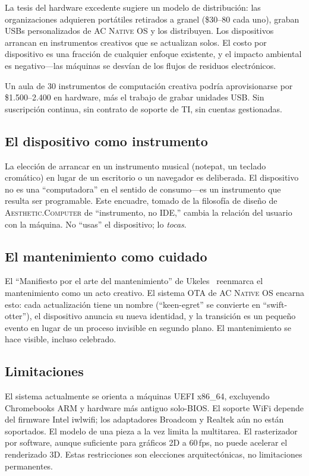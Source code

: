 \documentclass[10pt,letterpaper,twocolumn]{article}
\newcommand{\ac}{\textsc{Aesthetic.Computer}}
\newcommand{\acos}{\textsc{AC Native OS}}
\begin{document}
La tesis del hardware excedente sugiere un modelo de distribución: las organizaciones adquieren portátiles retirados a granel (\$30--80 cada uno), graban USBs personalizados de \acos{} y los distribuyen. Los dispositivos arrancan en instrumentos creativos que se actualizan solos. El costo por dispositivo es una fracción de cualquier enfoque existente, y el impacto ambiental es negativo---las máquinas se desvían de los flujos de residuos electrónicos.

Un aula de 30 instrumentos de computación creativa podría aprovisionarse por \$1.500--2.400 en hardware, más el trabajo de grabar unidades USB. Sin suscripción continua, sin contrato de soporte de TI, sin cuentas gestionadas.

\subsection{El dispositivo como instrumento}

La elección de arrancar en un instrumento musical (notepat, un teclado cromático) en lugar de un escritorio o un navegador es deliberada. El dispositivo no es una ``computadora'' en el sentido de consumo---es un instrumento que resulta ser programable. Este encuadre, tomado de la filosofía de diseño de \ac{} de ``instrumento, no IDE,'' cambia la relación del usuario con la máquina. No ``usas'' el dispositivo; lo \emph{tocas}.

\subsection{El mantenimiento como cuidado}

El ``Manifiesto por el arte del mantenimiento'' de Ukeles~\citep{ukeles1969manifesto} reenmarca el mantenimiento como un acto creativo. El sistema OTA de \acos{} encarna esto: cada actualización tiene un nombre (``keen-egret'' se convierte en ``swift-otter''), el dispositivo anuncia su nueva identidad, y la transición es un pequeño evento en lugar de un proceso invisible en segundo plano. El mantenimiento se hace visible, incluso celebrado.

\subsection{Limitaciones}

El sistema actualmente se orienta a máquinas UEFI x86\_64, excluyendo Chromebooks ARM y hardware más antiguo solo-BIOS. El soporte WiFi depende del firmware Intel iwlwifi; los adaptadores Broadcom y Realtek aún no están soportados. El modelo de una pieza a la vez limita la multitarea. El rasterizador por software, aunque suficiente para gráficos 2D a 60\,fps, no puede acelerar el renderizado 3D. Estas restricciones son elecciones arquitectónicas, no limitaciones permanentes.
\end{document}
